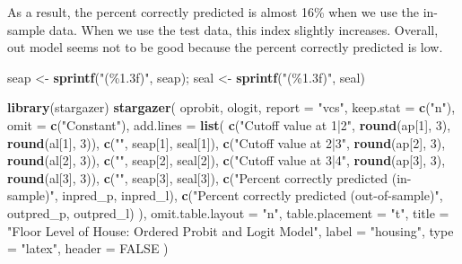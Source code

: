 \documentclass[
  12pt,
]{article}
\newenvironment{Shaded}{\begin{snugshade}}{\end{snugshade}}
\newcommand{\DataTypeTok}[1]{\textcolor[rgb]{0.13,0.29,0.53}{#1}}
\newcommand{\DecValTok}[1]{\textcolor[rgb]{0.00,0.00,0.81}{#1}}
\newcommand{\KeywordTok}[1]{\textcolor[rgb]{0.13,0.29,0.53}{\textbf{#1}}}
\newcommand{\NormalTok}[1]{#1}
\newcommand{\OtherTok}[1]{\textcolor[rgb]{0.56,0.35,0.01}{#1}}
\newcommand{\StringTok}[1]{\textcolor[rgb]{0.31,0.60,0.02}{#1}}
\begin{document}
As a result, the percent correctly predicted is almost 16\% when we use the in-sample data.
When we use the test data, this index slightly increases.
Overall, out model seems not to be good because the percent correctly predicted is low.

\begin{Shaded}
\begin{Highlighting}[]
\NormalTok{seap \textless{}{-}}\StringTok{ }\KeywordTok{sprintf}\NormalTok{(}\StringTok{"(\%1.3f)"}\NormalTok{, seap); seal \textless{}{-}}\StringTok{ }\KeywordTok{sprintf}\NormalTok{(}\StringTok{"(\%1.3f)"}\NormalTok{, seal)}

\KeywordTok{library}\NormalTok{(stargazer)}
\KeywordTok{stargazer}\NormalTok{(}
\NormalTok{  oprobit, ologit,}
  \DataTypeTok{report =} \StringTok{"vcs"}\NormalTok{, }\DataTypeTok{keep.stat =} \KeywordTok{c}\NormalTok{(}\StringTok{"n"}\NormalTok{),}
  \DataTypeTok{omit =} \KeywordTok{c}\NormalTok{(}\StringTok{"Constant"}\NormalTok{),}
  \DataTypeTok{add.lines =} \KeywordTok{list}\NormalTok{(}
    \KeywordTok{c}\NormalTok{(}\StringTok{"Cutoff value at 1|2"}\NormalTok{, }\KeywordTok{round}\NormalTok{(ap[}\DecValTok{1}\NormalTok{], }\DecValTok{3}\NormalTok{), }\KeywordTok{round}\NormalTok{(al[}\DecValTok{1}\NormalTok{], }\DecValTok{3}\NormalTok{)),}
    \KeywordTok{c}\NormalTok{(}\StringTok{""}\NormalTok{, seap[}\DecValTok{1}\NormalTok{], seal[}\DecValTok{1}\NormalTok{]),}
    \KeywordTok{c}\NormalTok{(}\StringTok{"Cutoff value at 2|3"}\NormalTok{, }\KeywordTok{round}\NormalTok{(ap[}\DecValTok{2}\NormalTok{], }\DecValTok{3}\NormalTok{), }\KeywordTok{round}\NormalTok{(al[}\DecValTok{2}\NormalTok{], }\DecValTok{3}\NormalTok{)),}
    \KeywordTok{c}\NormalTok{(}\StringTok{""}\NormalTok{, seap[}\DecValTok{2}\NormalTok{], seal[}\DecValTok{2}\NormalTok{]),}
    \KeywordTok{c}\NormalTok{(}\StringTok{"Cutoff value at 3|4"}\NormalTok{, }\KeywordTok{round}\NormalTok{(ap[}\DecValTok{3}\NormalTok{], }\DecValTok{3}\NormalTok{), }\KeywordTok{round}\NormalTok{(al[}\DecValTok{3}\NormalTok{], }\DecValTok{3}\NormalTok{)),}
    \KeywordTok{c}\NormalTok{(}\StringTok{""}\NormalTok{, seap[}\DecValTok{3}\NormalTok{], seal[}\DecValTok{3}\NormalTok{]),}
    \KeywordTok{c}\NormalTok{(}\StringTok{"Percent correctly predicted (in{-}sample)"}\NormalTok{, inpred\_p, inpred\_l),}
    \KeywordTok{c}\NormalTok{(}\StringTok{"Percent correctly predicted (out{-}of{-}sample)"}\NormalTok{, outpred\_p, outpred\_l)}
\NormalTok{  ),}
  \DataTypeTok{omit.table.layout =} \StringTok{"n"}\NormalTok{, }\DataTypeTok{table.placement =} \StringTok{"t"}\NormalTok{,}
  \DataTypeTok{title =} \StringTok{"Floor Level of House: Ordered Probit and Logit Model"}\NormalTok{,}
  \DataTypeTok{label =} \StringTok{"housing"}\NormalTok{,}
  \DataTypeTok{type =} \StringTok{"latex"}\NormalTok{, }\DataTypeTok{header =} \OtherTok{FALSE}
\NormalTok{)}
\end{Highlighting}
\end{Shaded}
\end{document}
